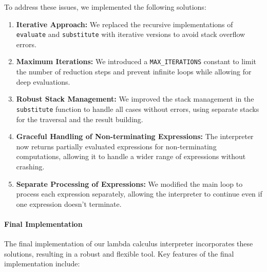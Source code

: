\documentclass{article}
\theoremstyle{theorem}
\theoremstyle{definition}
\theoremstyle{remark}
\begin{document}
To address these issues, we implemented the following solutions:

\begin{enumerate}
    \item \textbf{Iterative Approach:} We replaced the recursive implementations of \texttt{evaluate} and \texttt{substitute} with iterative versions to avoid stack overflow errors.
    \item \textbf{Maximum Iterations:} We introduced a \texttt{MAX\_ITERATIONS} constant to limit the number of reduction steps and prevent infinite loops while allowing for deep evaluations.
    \item \textbf{Robust Stack Management:} We improved the stack management in the \texttt{substitute} function to handle all cases without errors, using separate stacks for the traversal and the result building.
    \item \textbf{Graceful Handling of Non-terminating Expressions:} The interpreter now returns partially evaluated expressions for non-terminating computations, allowing it to handle a wider range of expressions without crashing.
    \item \textbf{Separate Processing of Expressions:} We modified the main loop to process each expression separately, allowing the interpreter to continue even if one expression doesn't terminate.
\end{enumerate}

\paragraph{Final Implementation}

The final implementation of our lambda calculus interpreter incorporates these solutions, resulting in a robust and flexible tool. Key features of the final implementation include:
\end{document}
